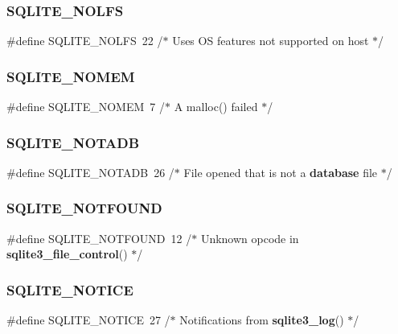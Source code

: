 \subsubsection{SQLITE\_NOLFS}
{\footnotesize\ttfamily \#define S\+Q\+L\+I\+T\+E\+\_\+\+N\+O\+L\+FS~22   /$\ast$ Uses OS features not supported on host $\ast$/}

\mbox{\label{sqlite3_8h_a9e34c7a5186dc9095e108e517eaac9f6}} 
\subsubsection{SQLITE\_NOMEM}
{\footnotesize\ttfamily \#define S\+Q\+L\+I\+T\+E\+\_\+\+N\+O\+M\+EM~7   /$\ast$ A malloc() failed $\ast$/}

\mbox{\label{sqlite3_8h_a880bb9bb0cdb7b6d6bafd05192ef029c}} 
\subsubsection{SQLITE\_NOTADB}
{\footnotesize\ttfamily \#define S\+Q\+L\+I\+T\+E\+\_\+\+N\+O\+T\+A\+DB~26   /$\ast$ File opened that is not a \textbf{ database} file $\ast$/}

\mbox{\label{sqlite3_8h_a305a03273389c4fa6313181a6de78dff}} 
\subsubsection{SQLITE\_NOTFOUND}
{\footnotesize\ttfamily \#define S\+Q\+L\+I\+T\+E\+\_\+\+N\+O\+T\+F\+O\+U\+ND~12   /$\ast$ Unknown opcode in \textbf{ sqlite3\+\_\+file\+\_\+control}() $\ast$/}

\mbox{\label{sqlite3_8h_a5e8334da26d0b5cd777f37df10e5e290}} 
\subsubsection{SQLITE\_NOTICE}
{\footnotesize\ttfamily \#define S\+Q\+L\+I\+T\+E\+\_\+\+N\+O\+T\+I\+CE~27   /$\ast$ Notifications from \textbf{ sqlite3\+\_\+log}() $\ast$/}

\mbox{\label{sqlite3_8h_af03ad2c8a1873c75d5b26158aadec057}} 
